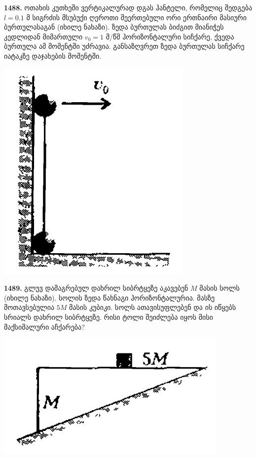 \documentclass[12pt,a4paper,]{report}
\begin{document}
\textbf{1488.} ოთახის კუთხეში ვერტიკალურად დგას ჰანტელი, რომელიც შედგება $l=0.1$ მ სიგრძის  მსუბუქი ღეროთი შეერთებული ორი ერთნაირი მასიური ბურთულასაგან (იხილე ნახაზი). ზედა ბურთულას ბიძგით მიანიჭეს კედლიდან მიმართული $v_0=1$ მ/წმ ჰორიზონტალური სიჩქარე, ქვედა ბურთულა ამ მომენტში უძრავია. განსაზღვრეთ ზედა ბურთულას სიჩქარე იატაკზე დაჯახების მომენტში.
		\begin{center}
			\includegraphics[scale=0.4]{images/F1488.png}
		\end{center}
	
\textbf{1489.} გლუვ დამაგრებულ დახრილ სიბრტყეზე აკავებენ $M$ მასის სოლს (იხილე ნახაზი). სოლის ზედა წახნაგი ჰორიზონტალურია. მასზე მოთავსებულია $5M$ მასის კუბიკი. სოლს ათავისუფლებენ და ის იწყებს სრიალს დახრილ სიბრტყეზე. რისი ტოლი შეიძლება იყოს მისი მაქსიმალური აჩქარება?
		\begin{center}
			\includegraphics[scale=0.4]{images/F1489.png}
		\end{center}
\end{document}
